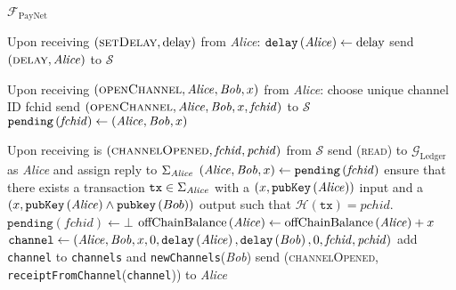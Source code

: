 \begin{functionality}{$\mathcal{F}_{\mathrm{PayNet}}$}
\begin{algorithmic}[1]
    \State Upon receiving $\left(\textsc{setDelay}, \mathrm{delay}\right)$ from
    \textit{Alice}:
    \Indent
      \State $\mathtt{delay}\left(\mathit{Alice}\right) \gets \mathrm{delay}$
      \State send $\left(\textsc{delay}, \mathit{Alice}\right)$ to $\mathcal{S}$
    \EndIndent
    \State

    \State Upon receiving $\left(\textsc{openChannel}, \mathit{Alice}, \mathit{Bob}, x\right)$
    from \textit{Alice}:
    \Indent
      \State choose unique channel ID fchid
      \State send $\left(\textsc{openChannel}, \mathit{Alice}, \mathit{Bob}, x,
      \mathit{fchid}\right)$ to $\mathcal{S}$
      \State $\mathtt{pending}\left(\mathit{fchid}\right) \gets \left(\mathit{Alice},
      \mathit{Bob}, x\right)$
    \EndIndent
    \State

    \State Upon receiving is $\left(\textsc{channelOpened}, \mathit{fchid},
    \mathit{pchid}\right)$ from $\mathcal{S}$
    \Indent
      \State send (\textsc{read}) to $\mathcal{G}_{\mathrm{Ledger}}$ as
      \textit{Alice} and assign reply to $\Sigma_{\mathit{Alice}}$
      \State $\left(\mathit{Alice}, \mathit{Bob}, x\right) \gets
      \mathtt{pending}\left(\mathit{fchid}\right)$
      \State ensure that there exists a transaction $\mathtt{tx} \in
      \Sigma_{\mathit{Alice}}$ with a $\left(x,
      \mathtt{pubKey}\left(\mathit{Alice}\right)\right)$ input and a $\left(x,
      \mathtt{pubKey}\left(\mathit{Alice}\right) \wedge
      \mathtt{pubkey}\left(Bob\right)\right)$ output such that
      $\mathcal{H}\left(\mathtt{tx}\right) = \mathit{pchid}$. 
      \State $\mathtt{pending}\left(\mathit{fchid}\right) \gets \bot$
      \State $\mathrm{offChainBalance}\left(\mathit{Alice}\right) \gets
      \mathrm{offChainBalance}\left(\mathit{Alice}\right) + x$ 
      \State $\mathtt{channel} \gets \left(\mathit{Alice}, \mathit{Bob}, x, 0,
      \mathtt{delay}\left(\mathit{Alice}\right), \mathtt{delay}\left(\mathit{Bob}\right), 0,
      \mathit{fchid}, \mathit{pchid}\right)$
      \State add \texttt{channel} to \texttt{channels} and
      \texttt{newChannels}(\textit{Bob})
      \State send (\textsc{channelOpened},
      \texttt{receiptFromChannel}(\texttt{channel})) to \textit{Alice}
    \EndIndent
    \State


\end{algorithmic}
\end{functionality}
